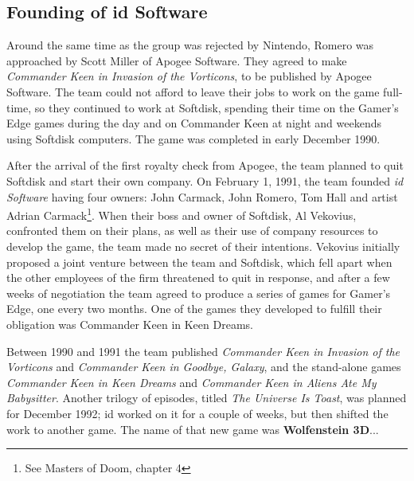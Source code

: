 \documentclass[book.tex]{subfiles}
\begin{document}
\subsection{Founding of id Software}
Around the same time as the group was rejected by Nintendo, Romero was approached by Scott Miller of Apogee Software. They agreed to make \textit{Commander Keen in Invasion of the Vorticons}, to be published by Apogee Software. The team could not afford to leave their jobs to work on the game full-time, so they continued to work at Softdisk, spending their time on the Gamer's Edge games during the day and on Commander Keen at night and weekends using Softdisk computers. The game was completed in early December 1990.\\

\par
After the arrival of the first royalty check from Apogee, the team planned to quit Softdisk and start their own company. On February 1, 1991, the team founded \textit{id Software} having four owners: John Carmack, John Romero, Tom Hall and artist Adrian Carmack\footnote{See Masters of Doom, chapter 4}. When their boss and owner of Softdisk, Al Vekovius, confronted them on their plans, as well as their use of company resources to develop the game, the team made no secret of their intentions. Vekovius initially proposed a joint venture between the team and Softdisk, which fell apart when the other employees of the firm threatened to quit in response, and after a few weeks of negotiation the team agreed to produce a series of games for Gamer's Edge, one every two months. One of the games they developed to fulfill their obligation was Commander Keen in Keen Dreams.\\

\par
Between 1990 and 1991 the team published \textit{Commander Keen in Invasion of the Vorticons} and \textit{Commander Keen in Goodbye, Galaxy}, and the stand-alone games \textit{Commander Keen in Keen Dreams} and \textit{Commander Keen in Aliens Ate My Babysitter}. Another trilogy of episodes, titled \textit{The Universe Is Toast}, was planned for December 1992; id worked on it for a couple of weeks, but then shifted the work to another game. The name of that new game was \textbf{Wolfenstein 3D}...
\end{document}
